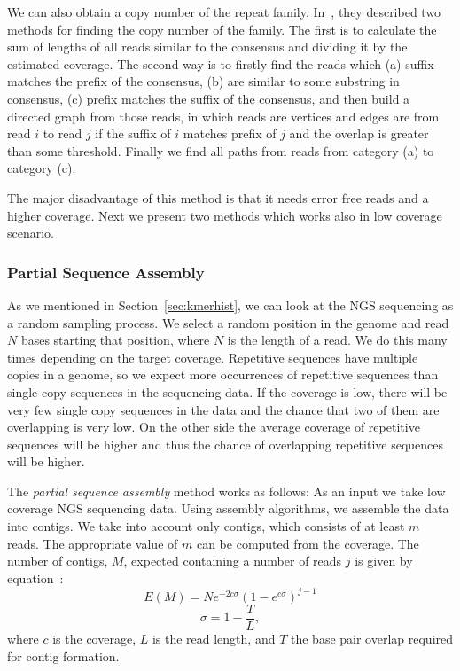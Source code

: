 We can also obtain a copy number of the repeat family. In~\cite{waterman}, they described two methods for finding the copy number of the family.
The first is to calculate the sum of lengths of all reads similar to the consensus and dividing it by the estimated coverage.
The second way is to firstly find the reads which (a) suffix matches the prefix of the consensus, (b) are similar to some substring in consensus, (c) prefix matches the suffix of the consensus, and then build a directed graph from those reads, in which reads are vertices and edges are from read $i$ to read $j$ if the suffix of $i$ matches prefix of $j$ and the overlap is greater than some threshold. Finally we find all paths from reads from category (a) to category (c).

The major disadvantage of this method is that it needs error free reads and a higher coverage.
Next we present two methods which works also in low coverage scenario.

\subsubsection{Partial Sequence Assembly}

As we mentioned in Section~\ref{sec:kmerhist}, we can look at the NGS sequencing as a random sampling process. We select a random position in the genome and read $N$ bases starting that position, where $N$ is the length of a read. We do this many times depending on the target coverage.
Repetitive sequences have multiple copies in a genome, so we expect more occurrences of repetitive sequences than single-copy sequences in the sequencing data. If the coverage is low, there will be very few single copy sequences in the data and the chance that two of them are overlapping is very low. On the other side the average coverage of repetitive sequences will be higher and thus the chance of overlapping repetitive sequences will be higher.

The \emph{partial sequence assembly} method works as follows: As an input we take low coverage NGS sequencing data. Using assembly algorithms, we assemble the data into contigs. We take into account only contigs, which consists of at least $m$ reads. The appropriate value of $m$ can be computed from the coverage. The number of contigs, $M$, expected containing a number of reads $j$ is given by equation~\cite{swaminathan2007global}:
$$E(M) = Ne^{-2c\sigma}{(1-e^{c\sigma})}^{j-1}$$
$$\sigma = 1 - \frac{T}{L},$$
where $c$ is the coverage, $L$ is the read length, and $T$ the base pair overlap required for contig formation.

